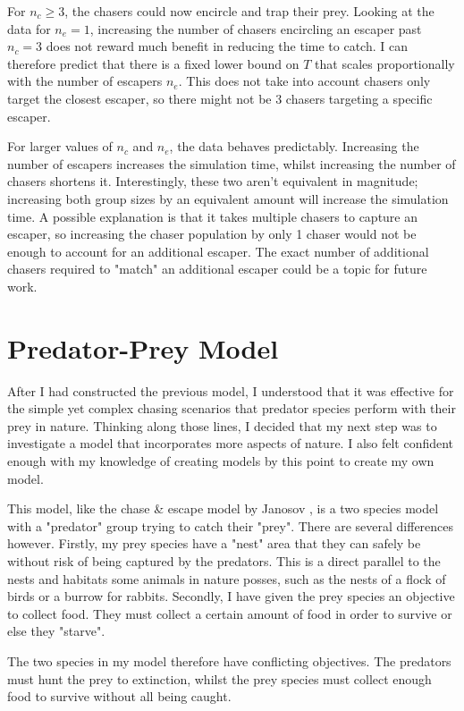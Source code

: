 \documentclass[%
11pt,
amsmath, amssymb,
aps,
pra
]{revtex4-2}
\begin{document}
For \(n_c \ge 3\), the chasers could now encircle and trap their prey. Looking at the data for \(n_e=1\), increasing
the number of chasers encircling an escaper past \(n_c=3\) does not reward much benefit in reducing the time to catch.
I can therefore predict that there is a fixed lower bound on \(T\)  that scales proportionally with the number of escapers \(n_e\). 
This does not take into account chasers only target the closest escaper, so there might not be 3 chasers targeting a specific escaper.

For larger values of \(n_c\) and \(n_e\), the data behaves predictably. Increasing the number of escapers increases
the simulation time, whilst increasing the number of chasers shortens it. Interestingly, these two aren't equivalent in magnitude;
increasing both group sizes by an equivalent amount will increase the simulation time. A possible explanation is that
it takes multiple chasers to capture an escaper, so increasing the chaser population by only 1 chaser would not be enough
to account for an additional escaper. The exact number of additional chasers required to "match" an additional escaper
could be a topic for future work. 

\section{Predator-Prey Model}
After I had constructed the previous model, I understood that it was effective for the simple yet complex chasing scenarios
that predator species perform with their prey in nature. Thinking along those lines, I decided that my next step was to
investigate a model that incorporates more aspects of nature. I also felt confident enough with my knowledge of creating models
by this point to create my own model.

This model, like the chase \& escape model by Janosov \cite{janosov2017group}, is a two species model with a "predator" group
trying to catch their "prey". There are several differences however. Firstly, my prey species have a "nest" area that they can
safely be without risk of being captured by the predators. This is a direct parallel to the nests and habitats some
animals in nature posses, such as the nests of a flock of birds or a burrow for rabbits. Secondly, I have given the
prey species an objective to collect food. They must collect a certain amount of food in order to survive or else they
"starve". 

The two species in my model therefore have conflicting objectives. The predators must hunt the prey to extinction, whilst the prey
species must collect enough food to survive without all being caught.  
\end{document}
